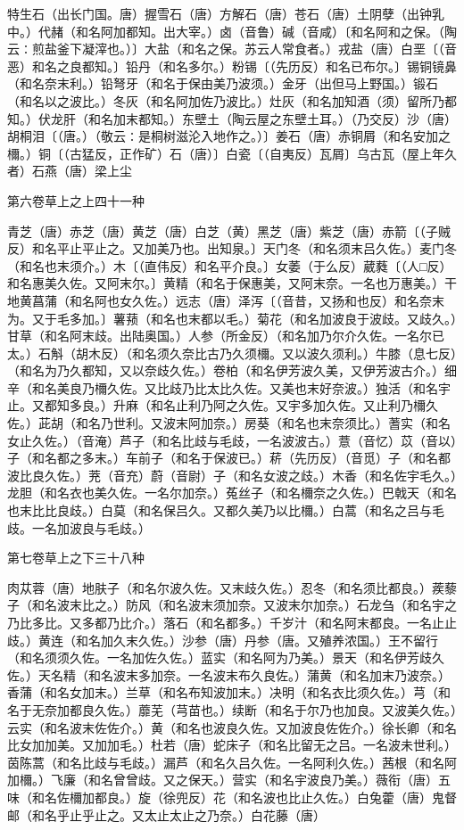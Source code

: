 \documentclass[a4paper,12pt,UTF8,twoside]{ctexbook}
\begin{document}
特生石（出长门国。唐）握雪石（唐）方解石（唐）苍石（唐）土阴孽（出钟乳中。）代赭（和名阿加都知。出大宰。）卤（音鲁）碱（音咸）〔和名阿和之保。（陶云∶煎盐釜下凝滓也。）〕大盐（和名之保。苏云人常食者。）戎盐（唐）白垩〔（音恶）和名之良都知。〕铅丹（和名多尔。）粉锡〔（先历反）和名已布尔。〕锡铜镜鼻（和名奈末利。）铅弩牙（和名于保由美乃波须。）金牙（出但马上野国。）锻石（和名以之波比。）冬灰（和名阿加佐乃波比。）灶灰（和名加知酒（须）留所乃都知。）伏龙肝（和名加末都知。）东壁土（陶云屋之东壁土耳。）（乃交反）沙（唐）胡桐泪〔（唐。）（敬云∶是桐树滋沦入地作之。）〕姜石（唐）赤铜屑（和名安加之檷。）铜〔（古猛反，正作矿）石（唐）〕白瓷〔（自夷反）瓦屑〕乌古瓦（屋上年久者）石燕（唐）梁上尘

第六卷草上之上四十一种

青芝（唐）赤芝（唐）黄芝（唐）白芝（黄）黑芝（唐）紫芝（唐）赤箭〔（子贼反）和名平止平止之。又加美乃也。出知泉。〕天门冬（和名须末吕久佐。）麦门冬（和名也末须介。）木〔（直伟反）和名平介良。〕女萎（于么反）葳蕤〔（人□反）和名惠美久佐。又阿末尔。〕黄精（和名于保惠美，又阿末奈。一名也万惠美。）干地黄菖蒲（和名阿也女久佐。）远志（唐）泽泻〔（音昔，又扬和也反）和名奈末为。又于毛多加。〕薯蓣（和名也末都以毛。）菊花（和名加波良于波歧。又歧久。）甘草（和名阿末歧。出陆奥国。）人参（所金反）（和名加乃尔介久佐。一名尔已太。）石斛（胡木反）（和名须久奈比古乃久须檷。又以波久须利。）牛膝（息七反）（和名为乃久都知，又以奈歧久佐。）卷柏（和名伊芳波久美，又伊芳波古介。）细辛（和名美良乃檷久佐。又比歧乃比太比久佐。又美也末好奈波。）独活（和名宇止。又都知多良。）升麻（和名止利乃阿之久佐。又宇多加久佐。又止利乃檷久佐。）茈胡（和名乃世利。又波末阿加奈。）房葵（和名也末奈须比。）蓍实（和名女止久佐。）（音淹）芦子（和名比歧与毛歧，一名波波古。）薏（音忆）苡（音以）子（和名都之多末。）车前子（和名于保波已。）菥（先历反）（音觅）子（和名都波比良久佐。）茺（音充）蔚（音尉）子（和名女波之歧。）木香（和名佐宇毛久。）龙胆（和名衣也美久佐。一名尔加奈。）菟丝子（和名檷奈之久佐。）巴戟天（和名也末比比良歧。）白莫（和名保吕久。又都久美乃以比檷。）白蒿（和名之吕与毛歧。一名加波良与毛歧。）

第七卷草上之下三十八种

肉苁蓉（唐）地肤子（和名尔波久佐。又末歧久佐。）忍冬（和名须比都良。）蒺藜子（和名波末比之。）防风（和名波末须加奈。又波末尔加奈。）石龙刍（和名宇之乃比多比。又多都乃比介。）落石（和名都多。）千岁汁（和名阿末都良。一名止止歧。）黄连（和名加久末久佐。）沙参（唐）丹参（唐。又殖养浓国。）王不留行（和名须须久佐。一名加佐久佐。）蓝实（和名阿为乃美。）景天（和名伊芳歧久佐。）天名精（和名波末多加奈。一名波末布久良佐。）蒲黄（和名加末乃波奈。）香蒲（和名女加末。）兰草（和名布知波加末。）决明（和名衣比须久佐。）芎（和名于无奈加都良久佐。）蘼芜（芎苗也。）续断（和名于尔乃也加良。又波美久佐。）云实（和名波末佐佐介。）黄（和名也波良久佐。又加波良佐佐介。）徐长卿（和名比女加加美。又加加毛。）杜若（唐）蛇床子（和名比留无之吕。一名波未世利。）茵陈蒿（和名比歧与毛歧。）漏芦（和名久吕久佐。一名阿利久佐。）茜根（和名阿加檷。）飞廉（和名曾曾歧。又之保天。）营实（和名宇波良乃美。）薇衔（唐）五味（和名佐檷加都良。）旋（徐兜反）花（和名波也比止久佐。）白兔藿（唐）鬼督邮（和名乎止乎止之。又太止太止之乃奈。）白花藤（唐）
\end{document}
